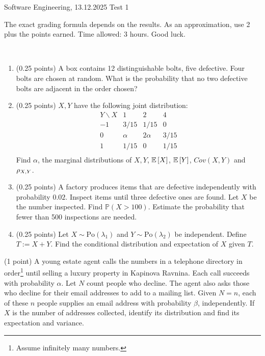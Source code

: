 \documentclass[a4paper]{report}
\begin{document}
\noindent Software Engineering, 13.12.2025 \hfill Test 1

\hrulefill

\begin{it}
The exact grading formula depends on the results. As an approximation, use 2 plus the points earned. Time allowed: 3 hours. Good luck.





\end{it}

\begin{problem}~
\begin{enumerate}
\item (0.25 points) A box contains 12 distinguishable bolts, five defective. Four bolts are chosen at random. What is the probability that no two defective bolts are adjacent in the order chosen?
    \item (0.25 points) $X,Y$ have the following joint distribution:
$$\begin{array}{c|ccc}
Y \backslash X & 1 & 2 & 4 \\
\hline
-1 & 3/15 & 1/15 & 0 \\
0 & \alpha & 2\alpha & 3/15 \\
1 & 1/15 & 0 & 1/15 \\
\end{array}$$
Find $\alpha$, the marginal distributions of $X,Y$, $\mathbb {E}\left[ X\right]$, $\mathbb {E}\left[ Y\right]$, $Cov(X,Y)$ and $\rho_{\tiny X,Y}$.
    \item (0.25 points) A factory produces items that are defective independently with probability $0.02$. Inspect items until three defective ones are found. Let $X$ be the number inspected. Find $\mathbb P(X>100)$. Estimate the probability that fewer than 500 inspections are needed.
    \item (0.25 points) Let $X\sim\mbox{Po}(\lambda_1)$ and $Y\sim\mbox{Po}(\lambda_2)$ be independent. Define $T:=X+Y$. Find the conditional distribution and expectation of $X$ given $T$.
\end{enumerate}
\end{problem}

\begin{problem} (1 point)
A young estate agent calls the numbers in a telephone directory in order\footnote{Assume infinitely many numbers.} until selling a luxury property in Kapinova Ravnina. Each call succeeds with probability $\alpha$. Let $N$ count people who decline. The agent also asks those who decline for their email addresses to add to a mailing list. Given $N=n$, each of these $n$ people supplies an email address with probability $\beta$, independently. If $X$ is the number of addresses collected, identify its distribution and find its expectation and variance.
\end{problem}
\end{document}
